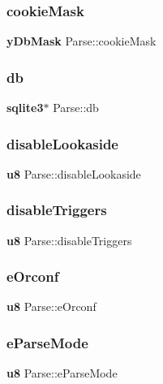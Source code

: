\subsubsection{cookieMask}
{\footnotesize\ttfamily \textbf{ y\+Db\+Mask} Parse\+::cookie\+Mask}

\mbox{\label{struct_parse_a44364e5e1197927f89864ec345bc5491}} 
\subsubsection{db}
{\footnotesize\ttfamily \textbf{ sqlite3}$\ast$ Parse\+::db}

\mbox{\label{struct_parse_a633c38a8e4512eb6415813636e2e97b4}} 
\subsubsection{disableLookaside}
{\footnotesize\ttfamily \textbf{ u8} Parse\+::disable\+Lookaside}

\mbox{\label{struct_parse_a5ea9b658f4cfacf4b35f18c51e144ef1}} 
\subsubsection{disableTriggers}
{\footnotesize\ttfamily \textbf{ u8} Parse\+::disable\+Triggers}

\mbox{\label{struct_parse_a67083fd2286b7d5276831e84a1a16680}} 
\subsubsection{eOrconf}
{\footnotesize\ttfamily \textbf{ u8} Parse\+::e\+Orconf}

\mbox{\label{struct_parse_adffdbb46216bb0bf06d611212d16d717}} 
\subsubsection{eParseMode}
{\footnotesize\ttfamily \textbf{ u8} Parse\+::e\+Parse\+Mode}

\mbox{\label{struct_parse_addd3028173ab100a8802dfcc9b13ffb7}} 
